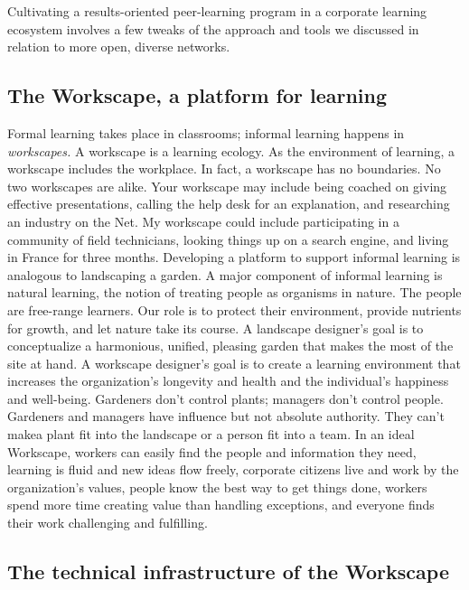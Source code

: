 Cultivating a results-oriented peer-learning program in a corporate
learning ecosystem involves a few tweaks of the approach and tools we
discussed in relation to more open, diverse networks.

\subsection{The Workscape, a platform for
learning}\label{the-workscape-a-platform-for-learning}

Formal learning takes place in classrooms; informal learning happens in
\emph{workscapes.} A workscape is a learning ecology. As the environment
of learning, a workscape includes the workplace. In fact, a workscape
has no boundaries. No two workscapes are alike. Your workscape may
include being coached on giving effective presentations, calling the
help desk for an explanation, and researching an industry on the Net. My
workscape could include participating in a community of field
technicians, looking things up on a search engine, and living in France
for three months. Developing a platform to support informal learning is
analogous to landscaping a garden. A major component of informal
learning is natural learning, the notion of treating people as organisms
in nature. The people are free-range learners. Our role is to protect
their environment, provide nutrients for growth, and let nature take its
course. A landscape designer's goal is to conceptualize a harmonious,
unified, pleasing garden that makes the most of the site at hand. A
workscape designer's goal is to create a learning environment that
increases the organization's longevity and health and the individual's
happiness and well-being. Gardeners don't control plants; managers don't
control people. Gardeners and managers have influence but not absolute
authority. They can't makea plant fit into the landscape or a person fit
into a team. In an ideal Workscape, workers can easily find the people
and information they need, learning is fluid and new ideas flow freely,
corporate citizens live and work by the organization's values, people
know the best way to get things done, workers spend more time creating
value than handling exceptions, and everyone finds their work
challenging and fulfilling.

\subsection{The technical infrastructure of the
Workscape}\label{the-technical-infrastructure-of-the-workscape}

